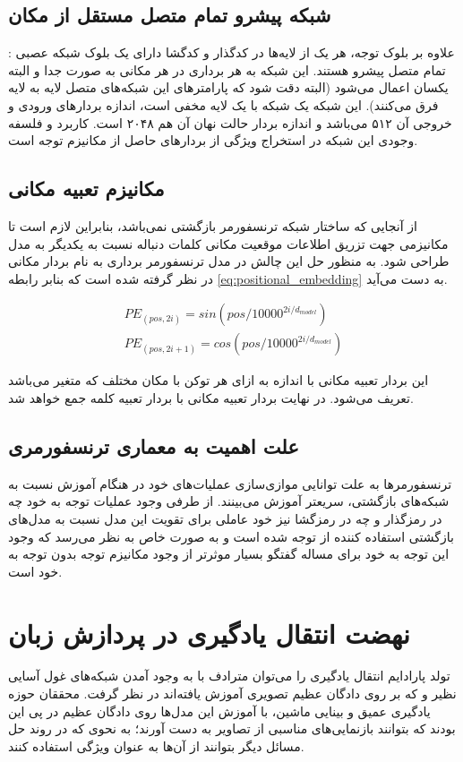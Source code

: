 \subsection{شبکه پیشرو تمام متصل مستقل از مکان}:
علاوه بر بلوک توجه، هر یک از لایه‌ها در کدگذار و کدگشا دارای یک بلوک شبکه عصبی تمام متصل پیشرو هستند. این شبکه به هر برداری در هر مکانی به صورت جدا و البته یکسان اعمال می‌شود (البته دقت شود که پارامتر‌های این شبکه‌های متصل لایه به لایه فرق می‌کنند). این شبکه یک شبکه با یک لایه مخفی است، اندازه بردارهای ورودی و خروجی آن ۵۱۲ می‌باشد و اندازه بردار حالت نهان آن هم ۲۰۴۸ است. کاربرد و فلسفه وجودی این شبکه در استخراج ویژگی از بردارهای حاصل از مکانیزم توجه است.


\subsection{
مکانیزم تعبیه
مکانی
}

از آنجایی که ساختار شبکه ترنسفورمر بازگشتی نمی‌باشد، بنابراین لازم است تا مکانیزمی جهت تزریق اطلاعات موقعیت مکانی کلمات دنباله نسبت به یکدیگر به مدل طراحی شود. به منظور حل این چالش در مدل ترنسفورمر برداری به نام بردار 
 مکانی در نظر گرفته شده است که بنابر رابطه
\ref{eq:positional_embedding}
به دست می‌آید.

\begin{align} \label{eq:positional_embedding}
PE_{(pos, 2i)} = sin(pos/10000^{2i/d_{model}}) \\  \nonumber
PE_{(pos, 2i+1)} = cos(pos/10000^{2i/d_{model}}) 
\end{align}

این بردار تعبیه مکانی با اندازه 
 به ازای هر توکن با مکان مختلف که متغیر
می‌باشد تعریف می‌شود. در نهایت بردار تعبیه مکانی با بردار تعبیه کلمه جمع خواهد شد.

\subsection{علت اهمیت به معماری ترنسفورمری}
ترنسفورمر‌ها به علت توانایی موازی‌سازی عملیات‌های خود در هنگام آموزش نسبت به شبکه‌های بازگشتی، سریعتر آموزش می‌بینند. از طرفی وجود عملیات توجه به خود چه در رمزگذار و چه در رمزگشا نیز خود عاملی برای تقویت این مدل نسبت به مدل‌های بازگشتی استفاده کننده از توجه شده است و به صورت خاص به نظر می‌رسد که وجود این توجه به خود برای مساله گفتگو بسیار موثرتر از وجود مکانیزم توجه بدون توجه به خود است.

\section{نهضت انتقال یادگیری در پردازش زبان}
تولد پارادایم انتقال یادگیری را می‌توان مترادف با به وجود آمدن شبکه‌های غول آسایی نظیر
و
که بر روی دادگان عظیم تصویری آموزش یافته‌اند در نظر گرفت. محققان حوزه یادگیری عمیق و بینایی ماشین، با آموزش این مدل‌ها روی دادگان عظیم در پی این بودند که بتوانند بازنمایی‌های مناسبی از تصاویر به دست آورند؛ به نحوی که در روند حل مسائل دیگر بتوانند از آن‌ها به عنوان ویژگی‌ استفاده کنند. 

